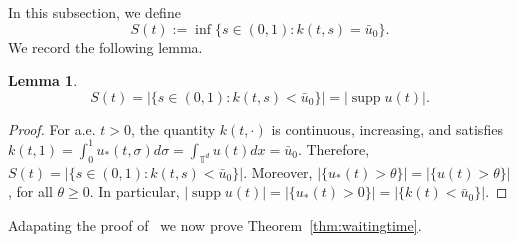 \documentclass[11pt]{article}
\newtheorem{lemma}[thm]{Lemma}
\numberwithin{equation}{section} %
\DeclareMathOperator{\supp}{supp}
\newcommand{\T}{{\mathbb{T}}}
\begin{document}
In this subsection, we define
\begin{equation*}
    S(t) := \inf\{s\in (0,1) : k(t,s) = \bar u_0 \}.
\end{equation*}
We record the following lemma. 
\begin{lemma} 
\begin{equation*}
    S(t) = |\{s\in (0,1) : k(t,s) <\bar u_0\}| = |\supp u(t)|. 
\end{equation*}
\end{lemma}
\begin{proof}
For a.e. $t>0$, the quantity $k(t,\cdot)$ is continuous, increasing, and satisfies $k(t,1)=\int_{0}^{1}u_{*}(t,\sigma)d\sigma = \int_{\T^d}u(t)dx = \bar{u}_0$. Therefore, $S(t) = |\{s\in (0,1) : k(t,s) <\bar u_0\}|$. Moreover, $|\{u_*(t)>\theta\}| = |\{u(t) >\theta \}|$, for all $\theta \ge0$. In particular, $|\supp u(t) | = |\{u_*(t) >0\}| = |\{k(t)<\bar u_0\}|$. 
\end{proof}
Adapating the proof of~\cite{CGV2022vortex} we now prove Theorem~\ref{thm:waitingtime}.
\end{document}
